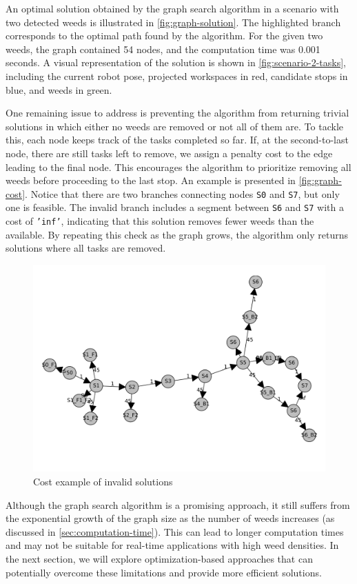 An optimal solution obtained by the graph search algorithm in a scenario with two detected weeds is illustrated in \autoref{fig:graph-solution}. The highlighted branch corresponds to the optimal path found by the algorithm. For the given two weeds, the graph contained 54 nodes, and the computation time was 0.001 seconds. A visual representation of the solution is shown in \autoref{fig:scenario-2-tasks}, including the current robot pose, projected workspaces in red, candidate stops in blue, and weeds in green.

One remaining issue to address is preventing the algorithm from returning trivial solutions in which either no weeds are removed or not all of them are. To tackle this, each node keeps track of the tasks completed so far. If, at the second-to-last node, there are still tasks left to remove, we assign a penalty cost to the edge leading to the final node. This encourages the algorithm to prioritize removing all weeds before proceeding to the last stop. An example is presented in \autoref{fig:graph-cost}. Notice that there are two branches connecting nodes \texttt{S0} and \texttt{S7}, but only one is feasible. The invalid branch includes a segment between \texttt{S6} and \texttt{S7} with a cost of \texttt{'inf'}, indicating that this solution removes fewer weeds than the available. By repeating this check as the graph grows, the algorithm only returns solutions where all tasks are removed.

\begin{figure}[hbt]
    \centering
    \includegraphics[width=0.7\linewidth]{gfx/ch02/graph_cost_inf.png}
    \caption{Cost example of invalid solutions}
    \label{fig:graph-cost}
\end{figure}

Although the graph search algorithm is a promising approach, it still suffers from the exponential growth of the graph size as the number of weeds increases (as discussed in \autoref{sec:computation-time}). This can lead to longer computation times and may not be suitable for real-time applications with high weed densities. In the next section, we will explore optimization-based approaches that can potentially overcome these limitations and provide more efficient solutions.


